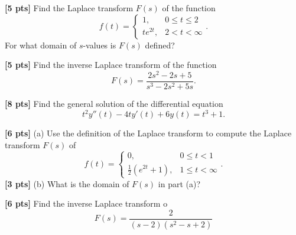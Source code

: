 \documentclass[11pt]{article}
\begin{document}
\begin{problem}
\textbf{[5 pts]} Find the Laplace transform $F (s)$ of the function
\begin{equation*}
 f(t) = \left\{\begin{array}{ll}1, & 0\leq t\leq 2 \\te^{2t}, & 2<t<\infty \end{array}\right. .
\end{equation*}
For what domain of $s$-values is $F (s)$ defined?
\end{problem}



\begin{problem}
\textbf{[5 pts]} Find the inverse Laplace transform of the function
\begin{equation*}
 F(s)=\frac{2s^{2}-2s +5}{s^{3}-2s^{2}+5s}.
\end{equation*}
\end{problem}



\begin{problem}
\textbf{[8 pts]} Find the general solution of the differential equation
\begin{equation*}
 t^{ 2} y'' (t) − 4ty' (t) + 6y(t) = t^{ 3} + 1 .
\end{equation*}
\end{problem}



\begin{problem}
\textbf{[6 pts]} (a) Use the definition of the Laplace transform to compute the Laplace transform $F (s) $ of 
\begin{equation*}
 f(t) = \left\{\begin{array}{ll}0, & 0\leq t< 1 \\\tfrac{1}{2}(e^{2t}+1), & 1\leq t<\infty \end{array}\right. .
\end{equation*}
\textbf{[3 pts]} (b) What is the domain of $F (s)$ in part (a)?
\end{problem}



\begin{problem}
\textbf{[6 pts]} Find the inverse Laplace transform o
\begin{equation*}
 F(s) = \frac{2}{(s-2)(s^{2}-s+2)}
\end{equation*}
\end{problem}
\end{document}
